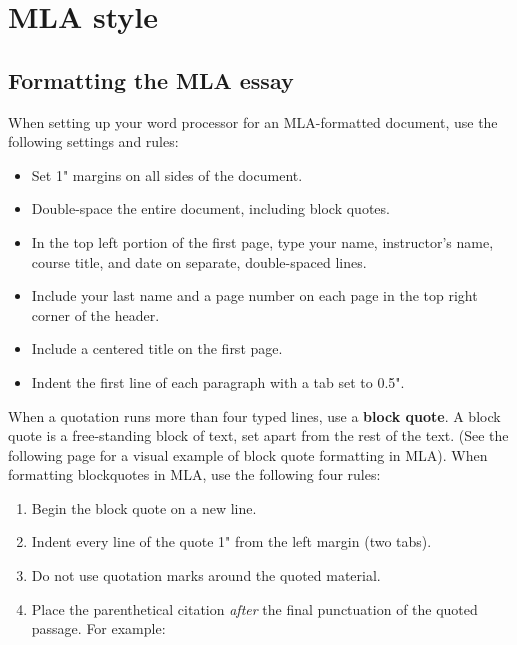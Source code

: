 

\chapter{MLA style} %


\section{Formatting the MLA essay}
When setting up your word processor for an MLA-formatted document, use the 
following settings and rules:

\begin{itemize}
\item Set 1" margins on all sides of the document.
\item Double-space the entire document, including block quotes.
\item In the top left portion of the first page, type your name, instructor's name, 
course title, and date on separate, double-spaced lines.
\item Include your last name and a page number on each page in the top right corner 
of the header.
\item Include a centered title on the first page.
\item Indent the first line of each paragraph with a tab set to 0.5".
\end{itemize}

When a quotation runs more than four typed lines, use a \textbf{block quote}. A block 
quote is a free-standing block of text, set apart from the rest of the text. (See the 
following page for a visual example of block quote formatting in MLA). When formatting 
blockquotes in MLA, use the following four rules: 

\begin{enumerate}
\item Begin the block quote on a new line. 
\item Indent every line of the quote 1" from the left margin (two tabs). 
\item Do not use quotation marks around the quoted material. 
\item Place the parenthetical citation \emph{after} the final punctuation of the quoted 
passage. For example:
\end{enumerate}

